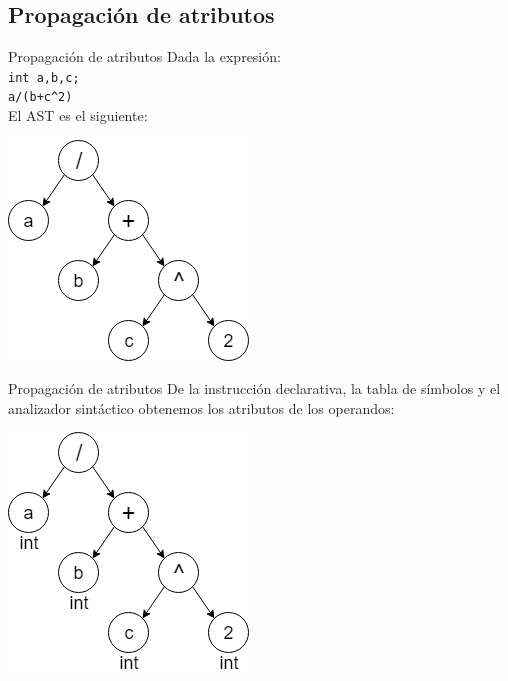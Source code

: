 \documentclass[handout]{beamer} %
\begin{document}
\subsection{Propagación de atributos}

\begin{frame}{Propagación de atributos}
    Dada la expresión:\\
    \hspace{3ex} \texttt{int a,b,c;}\\
    \hspace{3ex} \texttt{a/(b+c\string^2)}\\
    El AST es el siguiente:
    \pause
    \begin{center}
    \includegraphics[width=.5\textwidth]{./image/cap3/AST-1}
    \end{center}
\end{frame}

\begin{frame}{Propagación de atributos}
    De la instrucción declarativa, la tabla de símbolos y el analizador sintáctico obtenemos los atributos de los operandos:
    \begin{center}
    \includegraphics[width=.5\textwidth]{./image/cap3/AST-2}
    \end{center}
\end{frame}
\end{document}

